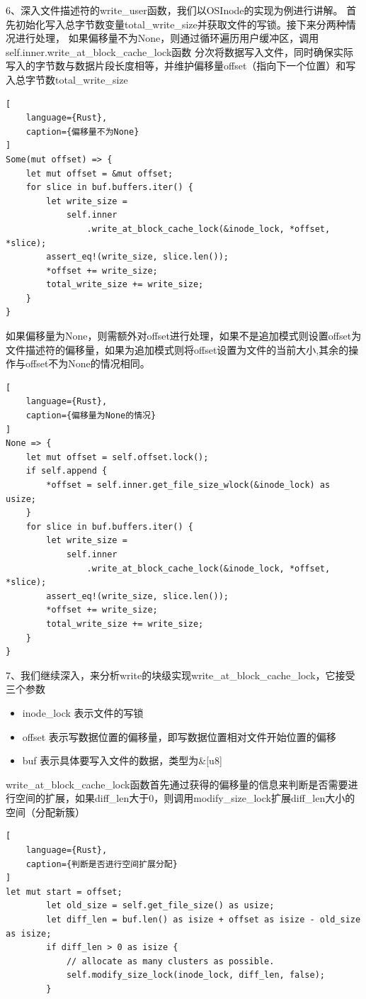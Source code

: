 6、深入文件描述符的write_user函数，我们以OSInode的实现为例进行讲解。
首先初始化写入总字节数变量total_write_size并获取文件的写锁。接下来分两种情况进行处理，
如果偏移量不为None，则通过循环遍历用户缓冲区，调用self.inner.write_at_block_cache_lock函数
分次将数据写入文件，同时确保实际写入的字节数与数据片段长度相等，并维护偏移量offset（指向下一个位置）和写入总字节数total_write_size
\begin{lstlisting}[
    language={Rust},
    caption={偏移量不为None}
]
Some(mut offset) => {
    let mut offset = &mut offset;
    for slice in buf.buffers.iter() {
        let write_size =
            self.inner
                .write_at_block_cache_lock(&inode_lock, *offset, *slice);
        assert_eq!(write_size, slice.len());
        *offset += write_size;
        total_write_size += write_size;
    }
}
\end{lstlisting}

如果偏移量为None，则需额外对offset进行处理，如果不是追加模式则设置offset为文件描述符的偏移量，如果为追加模式则将offset设置为文件的当前大小,其余的操作与offset不为None的情况相同。
\begin{lstlisting}[
    language={Rust},
    caption={偏移量为None的情况}
]
None => {
    let mut offset = self.offset.lock();
    if self.append {
        *offset = self.inner.get_file_size_wlock(&inode_lock) as usize;
    }
    for slice in buf.buffers.iter() {
        let write_size =
            self.inner
                .write_at_block_cache_lock(&inode_lock, *offset, *slice);
        assert_eq!(write_size, slice.len());
        *offset += write_size;
        total_write_size += write_size;
    }
}
\end{lstlisting}
7、我们继续深入，来分析write的块级实现write_at_block_cache_lock，它接受三个参数

\begin{itemize}
    \item inode_lock 表示文件的写锁
    \item offset 表示写数据位置的偏移量，即写数据位置相对文件开始位置的偏移
    \item buf 表示具体要写入文件的数据，类型为\&[u8]
\end{itemize}

write_at_block_cache_lock函数首先通过获得的偏移量的信息来判断是否需要进行空间的扩展，如果diff_len大于0，则调用modify_size_lock扩展diff_len大小的空间（分配新簇）
\begin{lstlisting}[
    language={Rust},
    caption={判断是否进行空间扩展分配}
]
let mut start = offset;
        let old_size = self.get_file_size() as usize;
        let diff_len = buf.len() as isize + offset as isize - old_size as isize;
        if diff_len > 0 as isize {
            // allocate as many clusters as possible.
            self.modify_size_lock(inode_lock, diff_len, false);
        }
\end{lstlisting}

